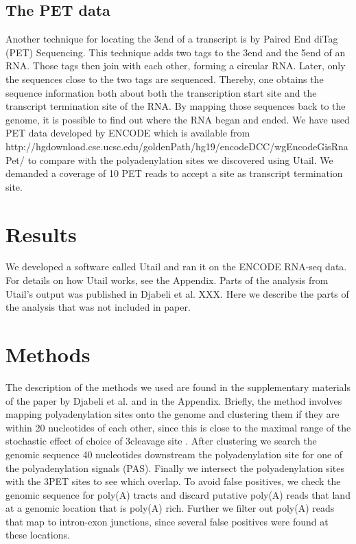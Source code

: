 \subsection{The PET data}
Another technique for locating the 3\p end of a transcript is by Paired End
diTag (PET) Sequencing. This technique adds two tags to the 3\p end and the
5\p end of an RNA. Those tags then join with each other, forming a circular
RNA. Later, only the sequences close to the two tags are sequenced. Thereby,
one obtains the sequence information both about both the transcription start
site and the transcript termination site of the RNA. By mapping those sequences
back to the genome, it is possible to find out where the RNA began and ended.
We have used PET data developed by ENCODE which is available from
http://hgdownload.cse.ucsc.edu/goldenPath/hg19/encodeDCC/wgEncodeGisRnaPet/ to
compare with the polyadenylation sites we discovered using Utail. We demanded a
coverage of 10 PET reads to accept a site as transcript termination site.

\section{Results}
We developed a software called Utail and ran it on the ENCODE RNA-seq data.
For details on how Utail works, see the Appendix. Parts of the analysis from
Utail's output was published in Djabeli et al. XXX. Here we describe the parts
of the analysis that was not included in paper.

\section{Methods}
The description of the methods we used are found in the supplementary materials
of the paper by Djabeli et al. and in the Appendix. Briefly, the method
involves mapping polyadenylation sites onto the genome and clustering them if
they are within 20 nucleotides of each other, since this is close to the
maximal range of the stochastic effect of choice of 3\p cleavage site
\cite{tian_large-scale_2005}. After clustering we search the genomic sequence
40 nucleotides downstream the polyadenylation site for one of the
polyadenylation signals (PAS). Finally we intersect the polyadenylation sites
with the 3\p PET sites to see which overlap. To avoid false positives, we check
the genomic sequence for poly(A) tracts and discard putative poly(A) reads that
land at a genomic location that is poly(A) rich. Further we filter out poly(A)
reads that map to intron-exon junctions, since several false positives were
found at these locations.

